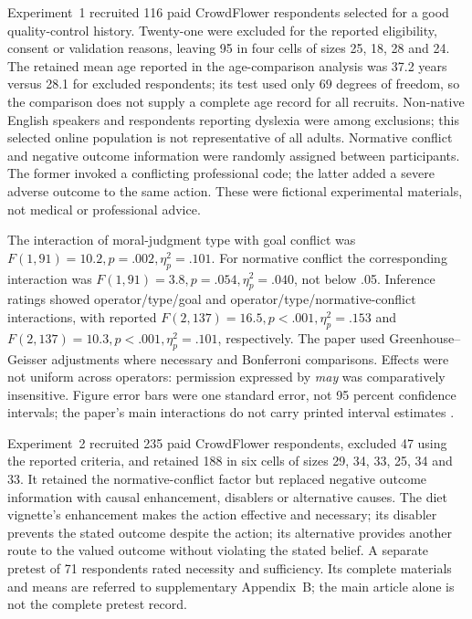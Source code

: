 Experiment~1 recruited 116 paid CrowdFlower respondents selected for a good
quality-control history. Twenty-one were excluded for the reported eligibility,
consent or validation reasons, leaving 95 in four cells of sizes 25, 18,
28 and 24. The retained mean age reported in the age-comparison analysis
was 37.2 years versus 28.1 for excluded respondents; its test used only
\(69\) degrees of freedom, so the comparison does not supply a complete
age record for all recruits. Non-native English speakers and respondents
reporting dyslexia were among exclusions; this selected online population is
not representative of all adults. Normative conflict and negative outcome
information were randomly assigned between participants. The former invoked
a conflicting professional code; the latter added a severe adverse outcome
to the same action. These were fictional experimental materials, not medical
or professional advice.

The interaction of moral-judgment type with goal conflict was
\(F(1,91)=10.2,p=.002,\eta_p^2=.101\). For normative conflict the
corresponding interaction was \(F(1,91)=3.8,p=.054,\eta_p^2=.040\),
not below .05. Inference ratings showed operator/type/goal and
operator/type/normative-conflict interactions, with reported
\(F(2,137)=16.5,p<.001,\eta_p^2=.153\) and
\(F(2,137)=10.3,p<.001,\eta_p^2=.101\), respectively.
The paper used Greenhouse--Geisser adjustments where necessary and
Bonferroni comparisons. Effects were not uniform across operators:
permission expressed by \emph{may} was comparatively insensitive.
Figure error bars were one standard error, not 95 percent confidence
intervals; the paper's main interactions do not carry printed interval estimates
\cite[pp.~8--10, figs.~2--5]{ElqayamEtAl2017MoralInference}.

Experiment~2 recruited 235 paid CrowdFlower respondents, excluded 47 using
the reported criteria, and retained 188 in six cells of sizes 29, 34, 33,
25, 34 and 33. It retained the normative-conflict factor but replaced negative
outcome information with causal enhancement, disablers or alternative causes.
The diet vignette's enhancement makes the action effective and necessary;
its disabler prevents the stated outcome despite the action; its alternative
provides another route to the valued outcome without violating the stated
belief. A separate pretest of 71 respondents rated necessity and sufficiency.
Its complete materials and means are referred to supplementary Appendix~B;
the main article alone is not the complete pretest record.


